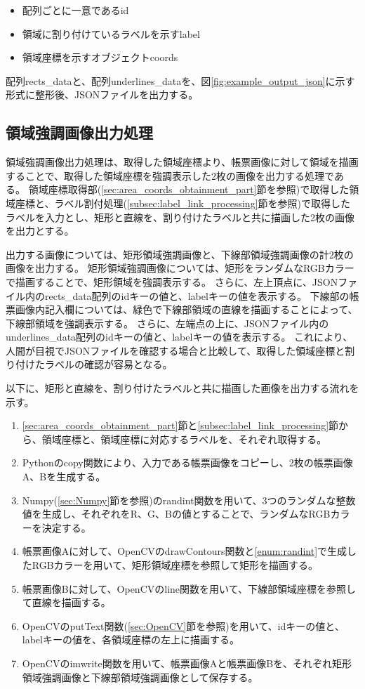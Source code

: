 \begin{itemize}
    \item 配列ごとに一意であるid
    \item 領域に割り付けているラベルを示すlabel
    \item 領域座標を示すオブジェクトcoords
\end{itemize}

配列rects\_dataと、配列underlines\_dataを、図\ref{fig:example_output_json}に示す形式に整形後、JSONファイルを出力する。

\subsection{領域強調画像出力処理}\label{subsec:area_highlighted_image_output_processing}
領域強調画像出力処理は、取得した領域座標より、帳票画像に対して領域を描画することで、取得した領域座標を強調表示した2枚の画像を出力する処理である。
領域座標取得部(\ref{sec:area_coords_obtainment_part}節を参照)で取得した領域座標と、ラベル割付処理(\ref{subsec:label_link_processing}節を参照)で取得したラベルを入力とし、矩形と直線を、割り付けたラベルと共に描画した2枚の画像を出力とする。

出力する画像については、矩形領域強調画像と、下線部領域強調画像の計2枚の画像を出力する。
矩形領域強調画像については、矩形をランダムなRGBカラーで描画することで、矩形領域を強調表示する。
さらに、左上頂点に、JSONファイル内のrects\_data配列のidキーの値と、labelキーの値を表示する。
下線部の帳票画像内記入欄については、緑色で下線部領域の直線を描画することによって、下線部領域を強調表示する。
さらに、左端点の上に、JSONファイル内のunderlines\_data配列のidキーの値と、labelキーの値を表示する。
これにより、人間が目視でJSONファイルを確認する場合と比較して、取得した領域座標と割り付けたラベルの確認が容易となる。

以下に、矩形と直線を、割り付けたラベルと共に描画した画像を出力する流れを示す。

\begin{enumerate}
    \item \ref{sec:area_coords_obtainment_part}節と\ref{subsec:label_link_processing}節から、領域座標と、領域座標に対応するラベルを、それぞれ取得する。
    \item Pythonのcopy関数により、入力である帳票画像をコピーし、2枚の帳票画像A、Bを生成する。
    \item \label{enum:randint}Numpy(\ref{sec:Numpy}節を参照)のrandint関数を用いて、3つのランダムな整数値を生成し、それぞれをR、G、Bの値とすることで、ランダムなRGBカラーを決定する。
    \item 帳票画像Aに対して、OpenCVのdrawContours関数と\ref{enum:randint}で生成したRGBカラーを用いて、矩形領域座標を参照して矩形を描画する。
    \item 帳票画像Bに対して、OpenCVのline関数を用いて、下線部領域座標を参照して直線を描画する。
    \item OpenCVのputText関数(\ref{sec:OpenCV}節を参照)を用いて、idキーの値と、labelキーの値を、各領域座標の左上に描画する。
    \item OpenCVのimwrite関数を用いて、帳票画像Aと帳票画像Bを、それぞれ矩形領域強調画像と下線部領域強調画像として保存する。
\end{enumerate}

